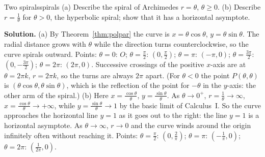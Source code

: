 \documentclass[11pt]{article}
\begin{document}
\begin{exmp}{Two spirals}{spirals}
(a) Describe the spiral of Archimedes $r=\theta$, $\theta\ge0$. (b) Describe $r=\frac1\theta$ for $\theta>0$, the hyperbolic spiral; show that it has a horizontal asymptote.

\textbf{Solution.} (a) By Theorem~\ref{thm:polpar} the curve is $x=\theta\cos\theta$, $y=\theta\sin\theta$. The radial distance grows with $\theta$ while the direction turns counterclockwise, so the curve spirals outward. Points: $\theta=0$: $O$; $\theta=\frac\pi2$: $\left(0,\frac\pi2\right)$; $\theta=\pi$: $(-\pi,0)$; $\theta=\frac{3\pi}2$: $\left(0,-\frac{3\pi}2\right)$; $\theta=2\pi$: $(2\pi,0)$. Successive crossings of the positive $x$-axis are at $\theta=2\pi k$, $r=2\pi k$, so the turns are always $2\pi$ apart. (For $\theta<0$ the point $P(\theta,\theta)$ is $(\theta\cos\theta,\theta\sin\theta)$, which is the reflection of the point for $-\theta$ in the $y$-axis: the other arm of the spiral.)
(b) Here $x=\frac{\cos\theta}\theta$, $y=\frac{\sin\theta}\theta$. As $\theta\to0^+$, $r=\frac1\theta\to\infty$, $x=\frac{\cos\theta}\theta\to+\infty$, while $y=\frac{\sin\theta}\theta\to1$ by the basic limit of Calculus~I. So the curve approaches the horizontal line $y=1$ as it goes out to the right: the line $y=1$ is a horizontal asymptote. As $\theta\to\infty$, $r\to0$ and the curve winds around the origin infinitely often without reaching it. Points: $\theta=\frac\pi2$: $\left(0,\frac2\pi\right)$; $\theta=\pi$: $\left(-\frac1\pi,0\right)$; $\theta=2\pi$: $\left(\frac1{2\pi},0\right)$.
\end{exmp}
\end{document}
